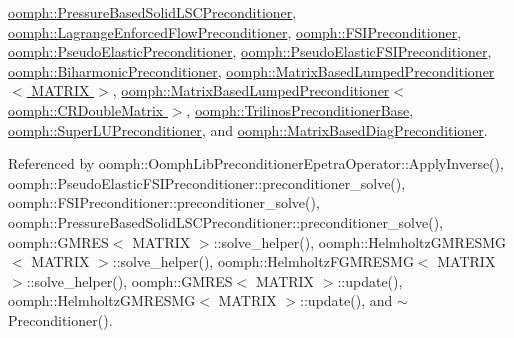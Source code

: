 \hyperlink{classoomph_1_1PressureBasedSolidLSCPreconditioner_ab81479f6e6a91ecb048f8c8d7e050744}{oomph\+::\+Pressure\+Based\+Solid\+L\+S\+C\+Preconditioner}, \hyperlink{classoomph_1_1LagrangeEnforcedFlowPreconditioner_a519940fc2faee5faac00b80004f3edea}{oomph\+::\+Lagrange\+Enforced\+Flow\+Preconditioner}, \hyperlink{classoomph_1_1FSIPreconditioner_a31c84c3ca19c31488acd0bf2fe333a6b}{oomph\+::\+F\+S\+I\+Preconditioner}, \hyperlink{classoomph_1_1PseudoElasticPreconditioner_a2533d2574d2c7d6613fda72b96a5f885}{oomph\+::\+Pseudo\+Elastic\+Preconditioner}, \hyperlink{classoomph_1_1PseudoElasticFSIPreconditioner_ad29c2852949caec2d20cbe7cf99f1b38}{oomph\+::\+Pseudo\+Elastic\+F\+S\+I\+Preconditioner}, \hyperlink{classoomph_1_1BiharmonicPreconditioner_a205babb3fe007ed93113a0c52ee4cf7d}{oomph\+::\+Biharmonic\+Preconditioner}, \hyperlink{classoomph_1_1MatrixBasedLumpedPreconditioner_a48a9cbf7b1a6afbe60b050de87ec8047}{oomph\+::\+Matrix\+Based\+Lumped\+Preconditioner$<$ M\+A\+T\+R\+I\+X $>$}, \hyperlink{classoomph_1_1MatrixBasedLumpedPreconditioner_a48a9cbf7b1a6afbe60b050de87ec8047}{oomph\+::\+Matrix\+Based\+Lumped\+Preconditioner$<$ oomph\+::\+C\+R\+Double\+Matrix $>$}, \hyperlink{classoomph_1_1TrilinosPreconditionerBase_a12ec6cf14b8d27ed9ef810dcad5e1182}{oomph\+::\+Trilinos\+Preconditioner\+Base}, \hyperlink{classoomph_1_1SuperLUPreconditioner_a687a7578834939a5ca70bd4871189ad0}{oomph\+::\+Super\+L\+U\+Preconditioner}, and \hyperlink{classoomph_1_1MatrixBasedDiagPreconditioner_a202ee7ff4183a585a0b9bd772e2cbcc1}{oomph\+::\+Matrix\+Based\+Diag\+Preconditioner}.



Referenced by oomph\+::\+Oomph\+Lib\+Preconditioner\+Epetra\+Operator\+::\+Apply\+Inverse(), oomph\+::\+Pseudo\+Elastic\+F\+S\+I\+Preconditioner\+::preconditioner\+\_\+solve(), oomph\+::\+F\+S\+I\+Preconditioner\+::preconditioner\+\_\+solve(), oomph\+::\+Pressure\+Based\+Solid\+L\+S\+C\+Preconditioner\+::preconditioner\+\_\+solve(), oomph\+::\+G\+M\+R\+E\+S$<$ M\+A\+T\+R\+I\+X $>$\+::solve\+\_\+helper(), oomph\+::\+Helmholtz\+G\+M\+R\+E\+S\+M\+G$<$ M\+A\+T\+R\+I\+X $>$\+::solve\+\_\+helper(), oomph\+::\+Helmholtz\+F\+G\+M\+R\+E\+S\+M\+G$<$ M\+A\+T\+R\+I\+X $>$\+::solve\+\_\+helper(), oomph\+::\+G\+M\+R\+E\+S$<$ M\+A\+T\+R\+I\+X $>$\+::update(), oomph\+::\+Helmholtz\+G\+M\+R\+E\+S\+M\+G$<$ M\+A\+T\+R\+I\+X $>$\+::update(), and $\sim$\+Preconditioner().

\mbox{\label{classoomph_1_1Preconditioner_a306f5a52f493816fcfda2dc9b2ee1dbf}} 
